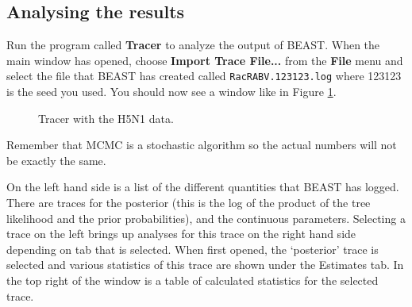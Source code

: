\documentclass{article}
\begin{document}
\subsection*{Analysing the results}

Run the program called {\bf Tracer} to analyze the output of BEAST. When the main
window has opened, choose {\bf Import Trace File...} from the {\bf File} menu and select the file that
BEAST has created called \texttt{RacRABV.123123.log} where 123123 is the seed you used.
You should now see a window like in Figure \ref{fig.tracer}.

\begin{figure}
\begin{center}


\end{center}
\caption{\label{fig.tracer} Tracer with the H5N1 data.}
\end{figure}


Remember that MCMC is a stochastic algorithm so the actual numbers will not be exactly the same.

On the left hand side is a list of the different quantities that BEAST has logged. There are traces for the posterior (this
is the log of the product of the tree likelihood and the prior probabilities), and the continuous parameters. Selecting a trace
on the left brings up analyses for this trace on the right hand side depending on tab that is selected. When first opened, the
`posterior' trace is selected and various statistics of this trace are shown under the Estimates tab.
In the top right of the window is a table of calculated statistics for the selected trace. 
\end{document}
